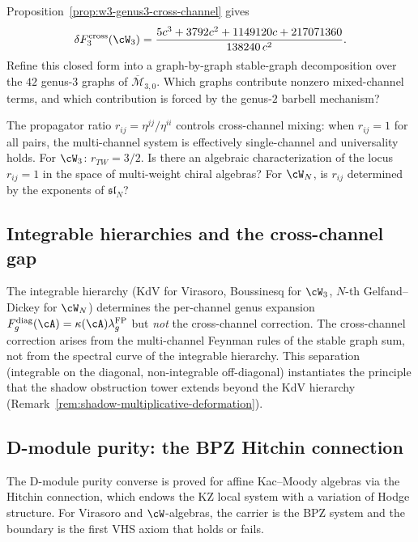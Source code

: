 \begin{question}\label{q:genus3-cross-channel}
Proposition~\ref{prop:w3-genus3-cross-channel} gives
\[
\delta F_3^{\mathrm{cross}}(\cW_3)
=
\frac{5c^3 + 3792c^2 + 1149120c + 217071360}{138240\,c^2}.
\]
Refine this closed form into a graph-by-graph stable-graph
decomposition over the $42$ genus-$3$ graphs of
$\overline{\mathcal M}_{3,0}$. Which graphs contribute nonzero
mixed-channel terms, and which contribution is forced by the
genus-$2$ barbell mechanism?
\end{question}

\begin{question}\label{q:propagator-ratio-invariant}
The propagator ratio $r_{ij} = \eta^{jj}/\eta^{ii}$ controls
cross-channel mixing: when $r_{ij} = 1$ for all pairs, the
multi-channel system is effectively single-channel and universality
holds. For $\cW_3$: $r_{TW} = 3/2$. Is there an algebraic
characterization of the locus $r_{ij} = 1$ in the space of
multi-weight chiral algebras? For $\cW_N$, is $r_{ij}$ determined
by the exponents of $\mathfrak{sl}_N$?
\end{question}

\subsection{Integrable hierarchies and the cross-channel gap}
\label{subsec:integrable-cross-channel-notes}

The integrable hierarchy (KdV for Virasoro, Boussinesq for $\cW_3$,
$N$-th Gelfand--Dickey for $\cW_N$) determines the per-channel genus
expansion
$F_g^{\mathrm{diag}}(\cA)=\kappa(\cA)\lambda_g^{\mathrm{FP}}$
but \emph{not} the cross-channel correction. The cross-channel
correction arises from the multi-channel Feynman rules of the stable
graph sum, not from the spectral curve of the integrable hierarchy.
This separation (integrable on the diagonal, non-integrable
off-diagonal) instantiates the principle that the shadow obstruction
tower extends beyond the KdV hierarchy
(Remark~\ref{rem:shadow-multiplicative-deformation}).

\subsection{D-module purity: the BPZ Hitchin connection}
\label{subsec:bpz-hitchin-notes}

The D-module purity converse is proved for affine Kac--Moody algebras
via the Hitchin connection, which endows the KZ local system with a
variation of Hodge structure. For Virasoro and $\cW$-algebras, the
carrier is the BPZ system and the boundary is the first VHS axiom that
holds or fails.

